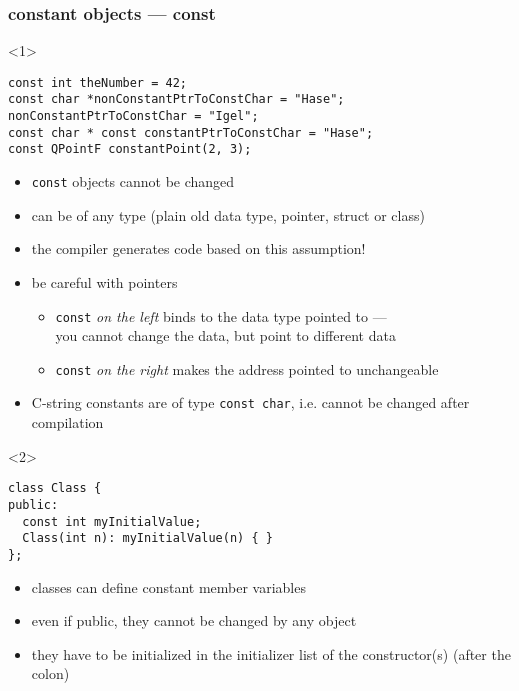 \documentclass{slides}
\begin{document}
\begin{frame}[fragile]
  \frametitle{constant objects --- const}
  \begin{onlyenv}<1>
\begin{lstlisting}[emph={const}]
const int theNumber = 42;
const char *nonConstantPtrToConstChar = "Hase";
nonConstantPtrToConstChar = "Igel";
const char * const constantPtrToConstChar = "Hase";
const QPointF constantPoint(2, 3);
\end{lstlisting}

    \begin{itemize}
    \item \lstinline!const! objects cannot be changed
    \item can be of any type (plain old data type, pointer, struct or class)
    \item the compiler generates code based on this assumption!
    \item be careful with pointers
      \begin{itemize}
      \item \lstinline!const! \emph{on the left} binds to the data
        type pointed to ---\\
        you cannot change the data, but point to different data
      \item \lstinline!const! \emph{on the right} makes the address
        pointed to unchangeable
      \end{itemize}
    \item C-string constants are of type \lstinline!const char!,
      i.e. cannot be changed after compilation
    \end{itemize}
  \end{onlyenv}

  \begin{onlyenv}<2>
\begin{lstlisting}[emph={const}]
class Class {
public:
  const int myInitialValue;
  Class(int n): myInitialValue(n) { }
};
\end{lstlisting}

    \begin{itemize}
    \item classes can define constant member variables
    \item even if public, they cannot be changed by any object
    \item they have to be initialized in the initializer list of the
      constructor(s) (after the colon)
    \end{itemize}


\end{onlyenv}
\end{frame}
\end{document}
